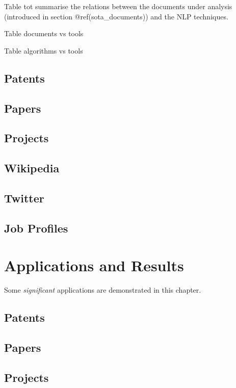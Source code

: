 \documentclass[]{book}
\theoremstyle{definition}
\theoremstyle{definition}
\theoremstyle{definition}
\theoremstyle{remark}
\begin{document}
Table tot summarise the relations between the documents under analysis
(introduced in section @ref(sota\_documents)) and the NLP techniques.

Table documents vs tools

Table algorithms vs tools

\section{Patents}\label{patents}

\section{Papers}\label{papers}

\section{Projects}\label{projects}

\section{Wikipedia}\label{wikipedia}

\section{Twitter}\label{twitter}

\section{Job Profiles}\label{job-profiles}

\chapter{Applications and Results}\label{applications-and-results}

Some \emph{significant} applications are demonstrated in this chapter.

\section{Patents}\label{patents-1}

\section{Papers}\label{papers-1}

\section{Projects}\label{projects-1}
\end{document}
